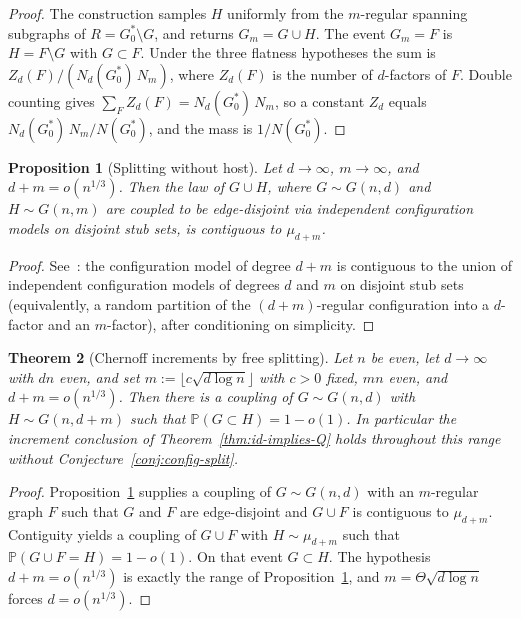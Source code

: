 \documentclass[11pt]{article}
\newtheorem{theorem}{Theorem}
\newtheorem{proposition}[theorem]{Proposition}
\newcommand{\Gnd}{G(n,d)}
\newcommand{\PP}{\mathbb{P}}
\begin{document}
\begin{proof}
The construction samples \(H\) uniformly from the \(m\)-regular spanning subgraphs of \(R=G^*_0\setminus G\), and returns \(G_m=G\cup H\).
The event \(G_m=F\) is \(H=F\setminus G\) with \(G\subset F\).
Under the three flatness hypotheses the sum is \(Z_d(F)/(N_d(G^*_0)\,N_m)\), where \(Z_d(F)\) is the number of \(d\)-factors of \(F\).
Double counting gives \(\sum_F Z_d(F)=N_d(G^*_0)\,N_m\), so a constant \(Z_d\) equals \(N_d(G^*_0)\,N_m/N(G^*_0)\), and the mass is \(1/N(G^*_0)\).
\end{proof}

\begin{proposition}[Splitting without host]
\label{prop:split-free}
Let \(d\to\infty\), \(m\to\infty\), and \(d+m=o(n^{1/3})\).
Then the law of \(G\cup H\), where \(G\sim\Gnd\) and \(H\sim G(n,m)\) are coupled to be
edge-disjoint via independent configuration models on disjoint stub sets, is
contiguous to \(\mu_{d+m}\).
\end{proposition}

\begin{proof}
See~\cite{Wormald99,JLR00}: the configuration model of degree \(d+m\) is contiguous
to the union of independent configuration models of degrees \(d\) and \(m\) on
disjoint stub sets (equivalently, a random partition of the
\((d+m)\)-regular configuration into a \(d\)-factor and an \(m\)-factor), after
conditioning on simplicity.
\end{proof}

\begin{theorem}[Chernoff increments by free splitting]
\label{thm:free-chernoff}
Let \(n\) be even, let \(d\to\infty\) with \(dn\) even, and set \(m:=\lfloor c\sqrt{d\log n}\rfloor\) with \(c>0\) fixed, \(mn\) even, and \(d+m=o(n^{1/3})\).
Then there is a coupling of \(G\sim\Gnd\) with \(H\sim G(n,d+m)\) such that \(\PP(G\subset H)=1-o(1)\).
In particular the increment conclusion of Theorem~\ref{thm:id-implies-Q} holds throughout this range without Conjecture~\ref{conj:config-split}.
\end{theorem}

\begin{proof}
Proposition~\ref{prop:split-free} supplies a coupling of \(G\sim\Gnd\) with an \(m\)-regular graph \(F\) such that \(G\) and \(F\) are edge-disjoint and \(G\cup F\) is contiguous to \(\mu_{d+m}\).
Contiguity yields a coupling of \(G\cup F\) with \(H\sim\mu_{d+m}\) such that \(\PP(G\cup F=H)=1-o(1)\).
On that event \(G\subset H\).
The hypothesis \(d+m=o(n^{1/3})\) is exactly the range of Proposition~\ref{prop:split-free}, and \(m=\Theta\sqrt{d\log n}\) forces \(d=o(n^{1/3})\).
\end{proof}
\end{document}
